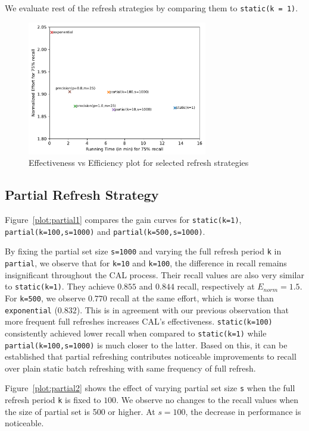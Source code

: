 We evaluate rest of the refresh strategies by comparing them to
\texttt{static(k = 1)}.

\begin{figure}
    \centering
    \includegraphics[width=0.7\textwidth]{plots/eff_vs_eff.pdf}
    \caption{Effectiveness vs Efficiency plot for selected refresh strategies}
    \label{plot:eff_vs_eff}
\end{figure}

\subsection*{Partial Refresh Strategy}
Figure~\ref{plot:partial1} compares the gain curves for
\texttt{static(k=1)}, \texttt{partial(k=100,s=1000)} and
\texttt{partial(k=500,s=1000)}.

By fixing the partial set size \texttt{s=1000} and varying the full refresh
period \texttt{k} in \texttt{partial}, we observe
that for \texttt{k=10} and \texttt{k=100}, the difference in recall remains insignificant throughout the
CAL process. Their recall values are also very similar to
\texttt{static(k=1)}. They achieve $0.855$ and $0.844$ recall, respectively at
$E_{norm} = 1.5$. For \texttt{k=500}, we observe $0.770$ recall at the
same effort, which is worse than \texttt{exponential} ($0.832$). This is in
agreement with our previous observation that more frequent full refreshes
increases CAL's effectiveness. \texttt{static(k=100)}
consistently achieved lower recall when compared to \texttt{static(k=1)} while
\texttt{partial(k=100,s=1000)} is much closer to the latter. Based
on this, it can be established that partial refreshing contributes noticeable
improvements to recall over plain static batch refreshing with same 
frequency of full refresh.

Figure~\ref{plot:partial2} shows the effect of varying partial set size
\texttt{s} when the full refresh period \texttt{k} is fixed to $100$. We observe
no changes to the recall values when the size of partial set is 500 or higher. At
$s=100$, the decrease in performance is noticeable.

